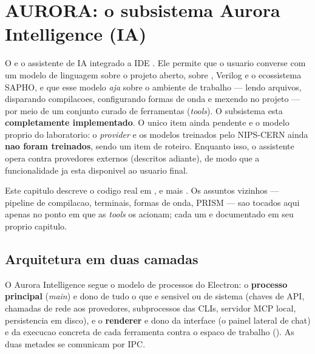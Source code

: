\chapter{AURORA: o subsistema Aurora Intelligence (IA)}
\label{cap:12-aurora-intelligence-ia}

O  e o assistente de IA integrado a IDE .
Ele permite que o usuario converse com um modelo de linguagem sobre o projeto
aberto, sobre \cmm{}, Verilog e o ecossistema SAPHO, e que esse modelo
\emph{aja} sobre o ambiente de trabalho --- lendo arquivos, disparando
compilacoes, configurando formas de onda e mexendo no projeto --- por meio de um
conjunto curado de ferramentas (\emph{tools}). O subsistema esta
\textbf{completamente implementado}. O unico item ainda pendente e o modelo
proprio do laboratorio: o \emph{provider} e os modelos treinados pelo NIPS-CERN
ainda \textbf{nao foram treinados}, sendo um item de roteiro. Enquanto isso, o
assistente opera contra provedores externos (descritos adiante), de modo que a
funcionalidade ja esta disponivel ao usuario final.

\begin{nota}
Este capitulo descreve o codigo real em ,
 e  mais
. Os assuntos vizinhos --- pipeline de
compilacao, terminais, formas de onda, PRISM --- sao tocados aqui apenas no
ponto em que as \emph{tools} os acionam; cada um e documentado em seu proprio
capitulo.
\end{nota}

\section{Arquitetura em duas camadas}

O Aurora Intelligence segue o modelo de processos do Electron: o
\textbf{processo principal} (\emph{main}) e dono de tudo o que e sensivel ou de
sistema (chaves de API, chamadas de rede aos provedores, subprocessos das CLIs,
servidor MCP local, persistencia em disco), e o \textbf{renderer} e dono da
interface (o painel lateral de chat) e da execucao concreta de cada ferramenta
contra o espaco de trabalho (). As duas metades se
comunicam por IPC.

